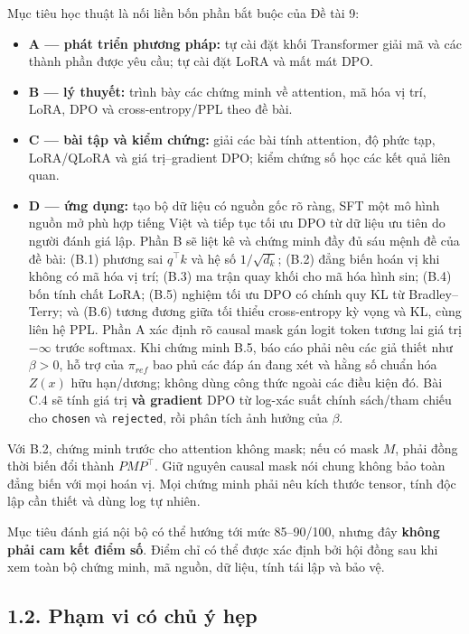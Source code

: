 \documentclass[11pt,a4paper]{article}
\providecommand{\tightlist}{\setlength{\itemsep}{0pt}\setlength{\parskip}{0pt}}
\begin{document}
Mục tiêu học thuật là nối liền bốn phần bắt buộc của Đề tài 9:

\begin{itemize}
\tightlist
\item
  \textbf{A --- phát triển phương pháp:} tự cài đặt khối Transformer
  giải mã và các thành phần được yêu cầu; tự cài đặt LoRA và mất mát
  DPO.
\item
  \textbf{B --- lý thuyết:} trình bày các chứng minh về attention, mã
  hóa vị trí, LoRA, DPO và cross-entropy/PPL theo đề bài.
\item
  \textbf{C --- bài tập và kiểm chứng:} giải các bài tính attention, độ
  phức tạp, LoRA/QLoRA và giá trị--gradient DPO; kiểm chứng số học các
  kết quả liên quan.
\item
  \textbf{D --- ứng dụng:} tạo bộ dữ liệu có nguồn gốc rõ ràng, SFT một
  mô hình nguồn mở phù hợp tiếng Việt và tiếp tục tối ưu DPO từ dữ liệu
  ưu tiên do người đánh giá lập. Phần B sẽ liệt kê và chứng minh đầy đủ
  sáu mệnh đề của đề bài: (B.1) phương sai \(q^\top k\) và hệ số
  \(1/\sqrt{d_k}\); (B.2) đẳng biến hoán vị khi không có mã hóa vị trí;
  (B.3) ma trận quay khối cho mã hóa hình sin; (B.4) bốn tính chất LoRA;
  (B.5) nghiệm tối ưu DPO có chính quy KL từ Bradley--Terry; và (B.6)
  tương đương giữa tối thiểu cross-entropy kỳ vọng và KL, cùng liên hệ
  PPL. Phần A xác định rõ causal mask gán logit token tương lai giá trị
  \(-\infty\) trước softmax. Khi chứng minh B.5, báo cáo phải nêu các
  giả thiết như \(\beta>0\), hỗ trợ của \(\pi_{ref}\) bao phủ các đáp án
  đang xét và hằng số chuẩn hóa \(Z(x)\) hữu hạn/dương; không dùng công
  thức ngoài các điều kiện đó. Bài C.4 sẽ tính giá trị \textbf{và
  gradient} DPO từ log-xác suất chính sách/tham chiếu cho
  \nolinkurl{chosen} và \nolinkurl{rejected}, rồi phân tích ảnh hưởng
  của \(\beta\).
\end{itemize}

Với B.2, chứng minh trước cho attention không mask; nếu có mask \(M\),
phải đồng thời biến đổi thành \(PMP^\top\). Giữ nguyên causal mask nói
chung không bảo toàn đẳng biến với mọi hoán vị. Mọi chứng minh phải nêu
kích thước tensor, tính độc lập cần thiết và dùng log tự nhiên.

Mục tiêu đánh giá nội bộ có thể hướng tới mức 85--90/100, nhưng đây
\textbf{không phải cam kết điểm số}. Điểm chỉ có thể được xác định bởi
hội đồng sau khi xem toàn bộ chứng minh, mã nguồn, dữ liệu, tính tái lập
và bảo vệ.

\subsection{1.2. Phạm vi có chủ ý
hẹp}\label{phux1ea1m-vi-cuxf3-chux1ee7-uxfd-hux1eb9p}
\end{document}
